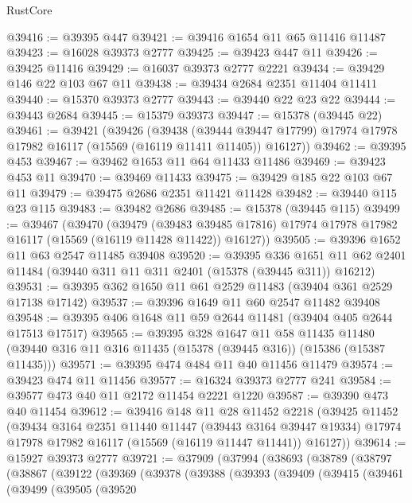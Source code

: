 \begin{lexlean}{RustCore}
\begin{coremodule}
@39416 := @39395 @447
@39421 := @39416 @1654 @11 @65 @11416 @11487
@39423 := @16028 @39373 @2777
@39425 := @39423 @447 @11
@39426 := @39425 @11416
@39429 := @16037 @39373 @2777 @2221
@39434 := @39429 @146 @22 @103 @67 @11
@39438 := @39434 @2684 @2351 @11404 @11411
@39440 := @15370 @39373 @2777
@39443 := @39440 @22 @23 @22
@39444 := @39443 @2684
@39445 := @15379 @39373
@39447 := @15378 (@39445 @22)
@39461 := @39421
    (@39426
      (@39438
        (@39444 @39447 @17799)
        @17974
        @17978
        @17982
        @16117
        (@15569 (@16119 @11411 @11405))
        @16127))
@39462 := @39395 @453
@39467 := @39462 @1653 @11 @64 @11433 @11486
@39469 := @39423 @453 @11
@39470 := @39469 @11433
@39475 := @39429 @185 @22 @103 @67 @11
@39479 := @39475 @2686 @2351 @11421 @11428
@39482 := @39440 @115 @23 @115
@39483 := @39482 @2686
@39485 := @15378 (@39445 @115)
@39499 := @39467
    (@39470
      (@39479
        (@39483 @39485 @17816)
        @17974
        @17978
        @17982
        @16117
        (@15569 (@16119 @11428 @11422))
        @16127))
@39505 := @39396 @1652 @11 @63 @2547 @11485 @39408
@39520 := @39395
    @336
    @1651
    @11
    @62
    @2401
    @11484
    (@39440 @311 @11 @311 @2401 (@15378 (@39445 @311)) @16212)
@39531 := @39395 @362 @1650 @11 @61 @2529 @11483 (@39404 @361 @2529 @17138 @17142)
@39537 := @39396 @1649 @11 @60 @2547 @11482 @39408
@39548 := @39395 @406 @1648 @11 @59 @2644 @11481 (@39404 @405 @2644 @17513 @17517)
@39565 := @39395
    @328
    @1647
    @11
    @58
    @11435
    @11480
    (@39440 @316 @11 @316 @11435 (@15378 (@39445 @316)) (@15386 (@15387 @11435)))
@39571 := @39395 @474 @484 @11 @40 @11456 @11479
@39574 := @39423 @474 @11 @11456
@39577 := @16324 @39373 @2777 @241
@39584 := @39577 @473 @40 @11 @2172 @11454 @2221 @1220
@39587 := @39390 @473 @40 @11454
@39612 := @39416
    @148
    @11
    @28
    @11452
    @2218
    (@39425
      @11452
      (@39434
        @3164
        @2351
        @11440
        @11447
        (@39443 @3164 @39447 @19334)
        @17974
        @17978
        @17982
        @16117
        (@15569 (@16119 @11447 @11441))
        @16127))
@39614 := @15927 @39373 @2777
@39721 := @37909
    (@37994
      (@38693
        (@38789
          (@38797
            (@38867
              (@39122
                (@39369
                  (@39378
                    (@39388
                      (@39393
                        (@39409
                          (@39415
                            (@39461
                              (@39499
                                (@39505
                                  (@39520

\end{coremodule}
\end{lexlean}
